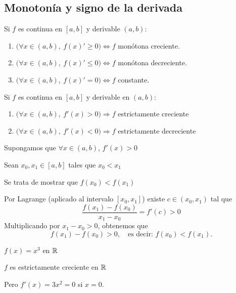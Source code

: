 \documentclass[11pt,a4paper]{article}
\begin{document}
\subsection{Monotonía y signo de la derivada}

\begin{proposicion}
  Si $f$ es continua en $[a,b]$ y derivable $(a,b)$:
  \begin{enumerate}[label=(\arabic*)]
    \item $\bigl(\forall x\in(a,b),\ f(x)'\geq 0\bigr)\iff f$ monótona creciente.
    \item $\bigl(\forall x\in(a,b),\ f(x)'\leq 0\bigr)\iff f$ monótona decreciente.
    \item $\bigl(\forall x\in(a,b),\ f(x)'=0\bigr)\iff f$ constante.
  \end{enumerate}
\end{proposicion}

\begin{proposicion}
  Si $f$ es continua en $[a,b]$ y derivable en $(a,b)$:
  \begin{enumerate}[label=(\arabic*)]
    \item $\bigl(\forall x\in(a,b),\ f'(x)>0\bigr)\Rightarrow f$ estrictamente creciente
    \item $\bigl(\forall x\in(a,b),\ f'(x)<0\bigr)\Rightarrow f$ estrictamente decreciente
  \end{enumerate}
\end{proposicion}

\begin{demo}[Demostración de (1)]
  Supongamos que $\forall x\in(a,b)$, $f'(x)>0$

  Sean $x_0,x_1\in[a,b]$ tales que $x_0<x_1$

  Se trata de mostrar que $f(x_0)<f(x_1)$

  Por Lagrange (aplicado al intervalo $[x_0,x_1]$) existe
  $c\in(x_0,x_1)$ tal que
  \[
    \frac{f(x_1)-f(x_0)}{x_1-x_0}=f'(c)>0
  \]
  Multiplicando por $x_1-x_0>0$, obtenemos que
  \[
    f(x_1)-f(x_0)>0,\quad\text{es decir: } f(x_0)<f(x_1).
  \]
\end{demo}

\begin{ejemplo}
  $f(x)=x^3$ en $\mathbb{R}$

  $f$ es estrictamente creciente en $\mathbb{R}$

  Pero $f'(x)=3x^2=0$ si $x=0$.
\end{ejemplo}
\end{document}
